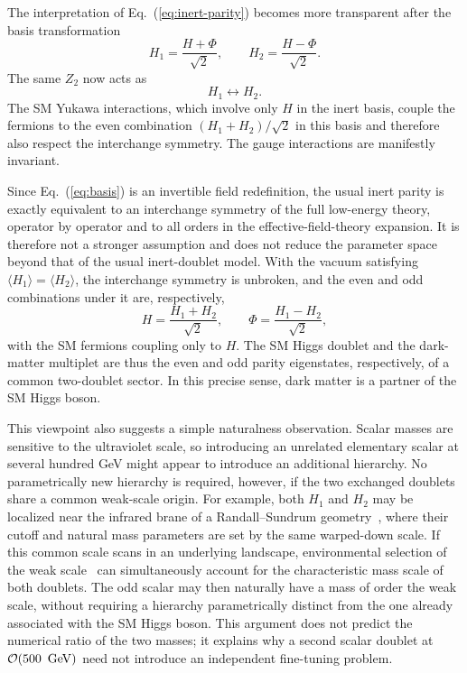 \documentclass[aps,prd,twocolumn,nofootinbib,superscriptaddress]{revtex4-2}
\newcommand{\GeV}{\,\mathrm{GeV}}
\begin{document}
The interpretation of Eq.~(\ref{eq:inert-parity}) becomes more transparent after the basis transformation
%
\begin{equation}
  H_1 = \frac{H+\Phi}{\sqrt2},\qquad
  H_2 = \frac{H-\Phi}{\sqrt2}.
\label{eq:basis}
\end{equation}
%
The same $Z_2$ now acts as
%
\begin{equation}
  H_1 \leftrightarrow H_2.
\label{eq:interchange}
\end{equation}
%
The SM Yukawa interactions, which involve only $H$ in the inert basis, couple the fermions to the even combination $(H_1 + H_2)/\sqrt{2}$ in this basis and therefore also respect the interchange symmetry. The gauge interactions are manifestly invariant.

Since Eq.~(\ref{eq:basis}) is an invertible field redefinition, the usual inert parity is exactly equivalent to an interchange symmetry of the full low-energy theory, operator by operator and to all orders in the effective-field-theory expansion. It is therefore not a stronger assumption and does not reduce the parameter space beyond that of the usual inert-doublet model. With the vacuum satisfying $\langle H_1 \rangle = \langle H_2 \rangle$, the interchange symmetry is unbroken, and the even and odd combinations under it are, respectively,
%
\begin{equation}
  H = \frac{H_1+H_2}{\sqrt2},
\qquad
 \Phi = \frac{H_1-H_2}{\sqrt2},
\end{equation}
%
with the SM fermions coupling only to $H$. The SM Higgs doublet and the dark-matter multiplet are thus the even and odd parity eigenstates, respectively, of a common two-doublet sector. In this precise sense, dark matter is a partner of the SM Higgs boson.

This viewpoint also suggests a simple naturalness observation. Scalar masses are sensitive to the ultraviolet scale, so introducing an unrelated elementary scalar at several hundred GeV might appear to introduce an additional hierarchy. No parametrically new hierarchy is required, however, if the two exchanged doublets share a common weak-scale origin. For example, both $H_1$ and $H_2$ may be localized near the infrared brane of a Randall--Sundrum geometry~\cite{Randall:1999ee}, where their cutoff and natural mass parameters are set by the same warped-down scale. If this common scale scans in an underlying landscape, environmental selection of the weak scale~\cite{Agrawal:1997gf} can simultaneously account for the characteristic mass scale of both doublets. The odd scalar may then naturally have a mass of order the weak scale, without requiring a hierarchy parametrically distinct from the one already associated with the SM Higgs boson. This argument does not predict the numerical ratio of the two masses; it explains why a second scalar doublet at ${\cal O}(500~\GeV)$ need not introduce an independent fine-tuning problem.
\end{document}
